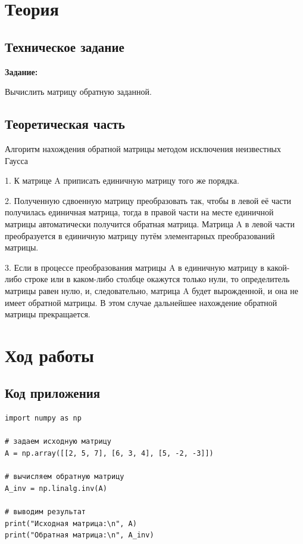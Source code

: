 \documentclass[12pt,a4paper]{scrartcl}
\begin{document}
\begin{enumerate}
\end{enumerate}
\large\tableofcontents

\vspace{25\baselineskip}

\section{Теория}
\subsection{Техническое задание}
\textbf {Задание:}

Вычислить матрицу обратную заданной.

\subsection{Теоретическая часть}

Алгоритм нахождения обратной матрицы методом исключения неизвестных Гаусса

1. К матрице A приписать единичную матрицу того же порядка.

2. Полученную сдвоенную матрицу преобразовать так, чтобы в левой её части получилась единичная матрица, тогда в правой части на месте единичной матрицы автоматически получится обратная матрица. Матрица A в левой части преобразуется в единичную матрицу путём элементарных преобразований матрицы.

3. Если в процессе преобразования матрицы A в единичную матрицу в какой-либо строке или в каком-либо столбце окажутся только нули, то определитель матрицы равен нулю, и, следовательно, матрица A будет вырожденной, и она не имеет обратной матрицы. В этом случае дальнейшее нахождение обратной матрицы прекращается.

\section{Ход работы}
\label{sec:exp}

\subsection{Код приложения}
\label{sec:exp:code}
\begin{verbatim}
import numpy as np

# задаем исходную матрицу
A = np.array([[2, 5, 7], [6, 3, 4], [5, -2, -3]])

# вычисляем обратную матрицу
A_inv = np.linalg.inv(A)

# выводим результат
print("Исходная матрица:\n", A)
print("Обратная матрица:\n", A_inv)
        \end{verbatim}
\end{document}
